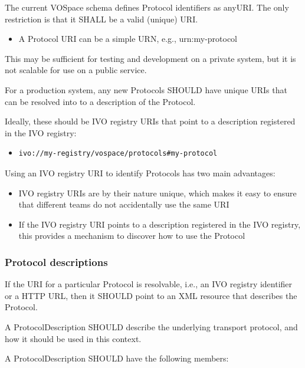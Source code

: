\documentclass[11pt,a4paper]{ivoa}
\begin{document}
The current VOSpace schema defines Protocol identifiers as anyURI. The only restriction is that it SHALL be a valid (unique) URI.

\begin{itemize}
    \item A Protocol URI can be a simple URN, e.g., urn:my-protocol
\end{itemize}

This may be sufficient for testing and development on a private system, but it is not scalable for use on a public service.

For a production system, any new Protocols SHOULD have unique URIs that can be resolved into to a description of the Protocol.

Ideally, these should be IVO registry URIs that point to a description registered in the IVO registry:

\begin{itemize}
    \item \begin{verbatim}ivo://my-registry/vospace/protocols#my-protocol\end{verbatim}
\end{itemize}

Using an IVO registry URI to identify Protocols has two main advantages:

\begin{itemize}
    \item IVO registry URIs are by their nature unique, which makes it easy to ensure that different teams do not accidentally use the same URI
    \item If the IVO registry URI points to a description registered in the IVO registry, this provides a mechanism to discover how to use the Protocol
\end{itemize}

\subsubsection{Protocol descriptions}
\label{subsubsec:protocol descriptions}
If the URI for a particular Protocol is resolvable, i.e., an IVO registry identifier or a HTTP URL, then it SHOULD point to an XML resource that describes the Protocol.

A ProtocolDescription SHOULD describe the underlying transport protocol, and how it should be used in this context.

A ProtocolDescription SHOULD have the following members:
\end{document}
